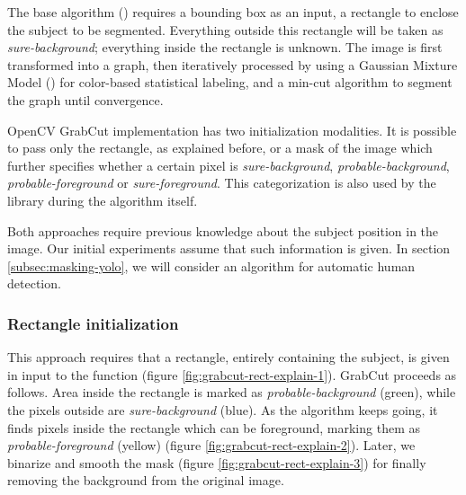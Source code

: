 The base algorithm (\cite{opencv_grabcut}) requires a bounding box as an input, a rectangle to enclose the subject to be segmented. Everything outside this rectangle will be taken as \textit{sure-background}; everything inside the rectangle is unknown. The image is first transformed into a graph, then iteratively processed by using a Gaussian Mixture Model (\cite{Reynolds2009}) for color-based statistical labeling, and a min-cut algorithm to segment the graph until convergence.

OpenCV GrabCut implementation has two initialization modalities. It is possible to pass only the rectangle, as explained before, or a mask of the image which further specifies whether a certain pixel is \textit{sure-background}, \textit{probable-background}, \textit{probable-foreground} or \textit{sure-foreground}. This categorization is also used by the library during the algorithm itself. 

\medskip

Both approaches require previous knowledge about the subject position in the image. Our initial experiments assume that such information is given. In section \ref{subsec:masking-yolo}, we will consider an algorithm for automatic human detection.


\subsubsection{Rectangle initialization}
\label{subsec:masking-grabcut-rect}

This approach requires that a rectangle, entirely containing the subject, is given in input to the function (figure \ref{fig:grabcut-rect-explain-1}). GrabCut proceeds as follows. Area inside the rectangle is marked as \textit{probable-background} (green), while the pixels outside are \textit{sure-background} (blue). As the algorithm keeps going, it finds pixels inside the rectangle which can be foreground, marking them as \textit{probable-foreground} (yellow) (figure \ref{fig:grabcut-rect-explain-2}). Later, we binarize and smooth the mask (figure \ref{fig:grabcut-rect-explain-3}) for finally removing the background from the original image.

